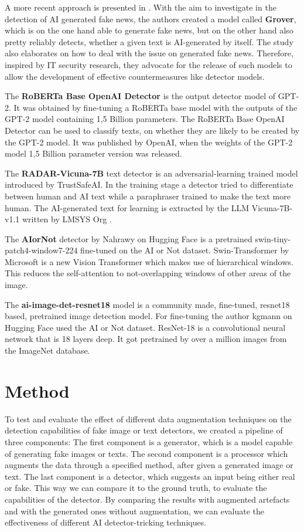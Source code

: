 \documentclass{article} %
\begin{document}
A more recent approach is presented in \cite{zellers2020defending}. With the aim to investigate in the detection of AI generated fake news, the authors created a model called \textbf{Grover}, which is on the one hand able to generate fake news, but on the other hand also pretty reliably detects, whether a given text is AI-generated by itself. The study also elaborates on how to deal with the issue on generated fake news. Therefore, inspired by IT security research, they advocate for the release of such models to allow the development of effective countermeasures like detector models.

The \textbf{RoBERTa Base OpenAI Detector} is the output detector model of GPT-2. It was obtained by fine-tuning a RoBERTa base model with the outputs of the GPT-2 model containing 1,5 Billion parameters. The RoBERTa Base OpenAI Detector can be used to classify texts, on whether they are likely to be created by the GPT-2 model. It was published by OpenAI, when the weights of the GPT-2 model 1,5 Billion parameter version was released.

The \textbf{RADAR-Vicuna-7B} text detector is an adversarial-learning trained model introduced by TrustSafeAI. In the training stage a detector tried to differentiate between human and AI text while a paraphraser trained to make the text more human. The AI-generated text for learning is extracted by the LLM Vicuna-7B-v1.1 written by LMSYS Org \cite{hu2023radar}.

The \textbf{AIorNot} detector by Nahrawy on Hugging Face is a pretrained swin-tiny-patch4-window7-224 fine-tuned on the AI or Not dataset. Swin-Transformer by Microsoft is a new Vision Transformer which makes use of hierarchical windows. This reduces the self-attention to not-overlapping windows of other areas of the image. \cite{liu2021swin}

The \textbf{ai-image-det-resnet18} model is a community made, fine-tuned, resnet18 based, pretrained image detection model. For fine-tuning the author kgmann on Hugging Face used the AI or Not dataset. ResNet-18 is a convolutional neural network that is 18 layers deep. It got pretrained by over a million images from the ImageNet database. \cite{he2015deep}


\section{Method}
To test and evaluate the effect of different data augmentation techniques on the detection capabilities of fake image or text detectors, we created a pipeline of three components: The first component is a generator, which is a model capable of generating fake images or texts. The second component is a processor which augments the data through a specified method, after given a generated image or text. The last component is a detector, which suggests an input being either real or fake. This way we can compare it to the ground truth, to evaluate the capabilities of the detector. By comparing the results with augmented artefacts and with the generated ones without augmentation, we can evaluate the effectiveness of different AI detector-tricking techniques.
\end{document}
